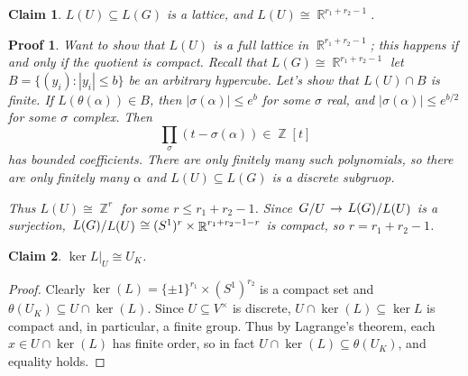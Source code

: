 \documentclass[11pt, a4paper]{memoir}
\DeclareMathOperator{\Z}{{\mathbb{Z}}}
\DeclareMathOperator{\R}{{\mathbb{R}}}
\theoremstyle{change}
\theoremstyle{plain}
\newtheorem{claim}{Claim}
\theoremstyle{nonumberplain}
\newtheorem{proof}{Proof}
\newtheorem{nmproof}{Proof}
\newcommand{\quot}[2]{\mathchoice{\left.\raisebox{0.07em}{$#1$}\middle/\raisebox{-0.07em}{$#2$}\right.}
                                 {\left.\raisebox{0.03em}{$#1$}\middle/\raisebox{-0.03em}{$#2$}\right.}
                                 {\left.\raisebox{0.00em}{$#1$}\middle/\raisebox{-0.00em}{$#2$}\right.}
                                 {\left.\raisebox{0em}{$#1$}\middle/\raisebox{0em}{$#2$}\right.}}
\numberwithin{equation}{section}
\begin{document}
\begin{claim}\label{c:k2}
    $L(U)\subseteq L(G)$ is a lattice, and $L(U)\cong\R^{r_1+r_2-1}$.
\end{claim}
\begin{nmproof}
    \textit{Want to show that $L(U)$ is a full lattice in $\R^{r_1+r_2-1}$; this happens if and only if the quotient is compact.}
    Recall that $L(G)\cong\R^{r_1+r_2-1}$ let $B=\{(y_i):|y_i|\leq b\}$ be an arbitrary hypercube.
    Let's show that $L(U)\cap B$ is finite.
    If $L(\theta(\alpha))\in B$, then $|\sigma(\alpha)|\leq e^b$ for some $\sigma$ real, and $|\sigma(\alpha)|\leq e^{b/2}$ for some $\sigma$ complex.
    Then
    \begin{equation*}
        \prod_\sigma(t-\sigma(\alpha))\in\Z[t]
    \end{equation*}
    has bounded coefficients.
    There are only finitely many such polynomials, so there are only finitely many $\alpha$ and $L(U)\subseteq L(G)$ is a discrete subgruop.

    Thus $L(U)\cong\Z^r$ for some $r\leq r_1+r_2-1$.
    Since $\quot{G}{U}\to \quot{L(G)}{L(U)}$ is a surjection, $\quot{L(G)}{L(U)}\cong (S^1)^r\times\R^{r_1+r_2-1-r}$ is compact, so $r=r_1+r_2-1$.
\end{nmproof}
\begin{claim}\label{c:k3}
    $\ker L|_U\cong U_K$.
\end{claim}
\begin{proof}
    Clearly $\ker(L)=\{\pm 1\}^{r_1}\times (S^1)^{r_2}$ is a compact set and $\theta(U_K)\subseteq U\cap\ker(L)$.
    Since $U\subseteq V^\times$ is discrete, $U\cap\ker(L)\subseteq\ker L$ is compact and, in particular, a finite group.
    Thus by Lagrange's theorem, each $x\in U\cap \ker(L)$ has finite order, so in fact $U\cap \ker(L)\subseteq\theta(U_K)$, and equality holds.
\end{proof}

\end{document}
